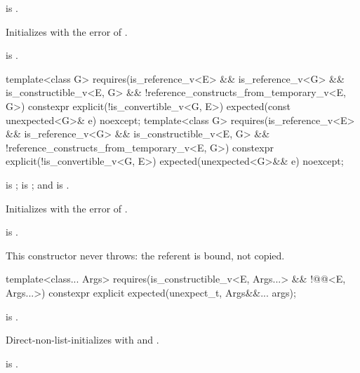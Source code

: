 \begin{itemdescr}
\pnum
\constraints
{} is .

\pnum
\effects
Initializes  with the error of .

\pnum
\ensures
{} is .
\end{itemdescr}

%
\begin{itemdecl}
template<class G>
  requires(is_reference_v<E> && is_reference_v<G> && is_constructible_v<E, G> &&
           !reference_constructs_from_temporary_v<E, G>)
constexpr explicit(!is_convertible_v<G, E>) expected(const unexpected<G>& e) noexcept;
template<class G>
  requires(is_reference_v<E> && is_reference_v<G> && is_constructible_v<E, G> &&
           !reference_constructs_from_temporary_v<E, G>)
constexpr explicit(!is_convertible_v<G, E>) expected(unexpected<G>&& e) noexcept;
\end{itemdecl}

\begin{itemdescr}
\pnum
\constraints
{} is ;  is ; and  is .

\pnum
\effects
Initializes  with the error of .

\pnum
\ensures
{} is .

\pnum
\remarks
This constructor never throws: the referent is bound, not copied.
\end{itemdescr}

%
\begin{itemdecl}
template<class... Args>
  requires(is_constructible_v<E, Args...> && !@@<E, Args...>)
constexpr explicit expected(unexpect_t, Args&&... args);
\end{itemdecl}

\begin{itemdescr}
\pnum
\constraints
{} is .

\pnum
\effects
Direct-non-list-initializes  with  and .

\pnum
\ensures
{} is .
\end{itemdescr}

